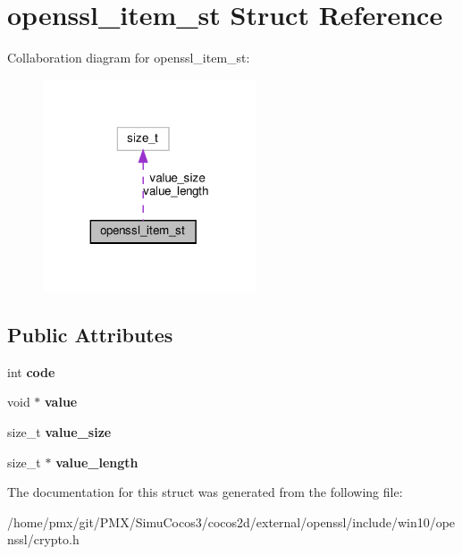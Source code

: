 \hypertarget{structopenssl__item__st}{}\section{openssl\+\_\+item\+\_\+st Struct Reference}
\label{structopenssl__item__st}


Collaboration diagram for openssl\+\_\+item\+\_\+st\+:
\nopagebreak
\begin{figure}[H]
\begin{center}
\leavevmode
\includegraphics[width=179pt]{structopenssl__item__st__coll__graph}
\end{center}
\end{figure}
\subsection*{Public Attributes}
\begin{DoxyCompactItemize}
\item 
\mbox{\label{structopenssl__item__st_a5e174401dbd1505959e9fab66d07530e}} 
int {\bfseries code}
\item 
\mbox{\label{structopenssl__item__st_a98e9b9c11f757937cee8119f22c3e116}} 
void $\ast$ {\bfseries value}
\item 
\mbox{\label{structopenssl__item__st_ab073a992ed1a5ba36d5e8627ca42e93d}} 
size\+\_\+t {\bfseries value\+\_\+size}
\item 
\mbox{\label{structopenssl__item__st_a1df8749d942642c9a3d867bd574d647a}} 
size\+\_\+t $\ast$ {\bfseries value\+\_\+length}
\end{DoxyCompactItemize}


The documentation for this struct was generated from the following file\+:\begin{DoxyCompactItemize}
\item 
/home/pmx/git/\+P\+M\+X/\+Simu\+Cocos3/cocos2d/external/openssl/include/win10/openssl/crypto.\+h\end{DoxyCompactItemize}
